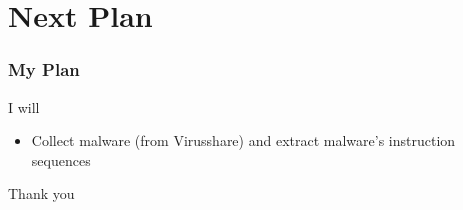 \documentclass{beamer}
\begin{document}
\section{Next Plan}
\begin{frame}[label=plan]
\frametitle{My Plan}
I will 
\begin{itemize}
	\item Collect malware (from Virusshare) and extract malware's instruction sequences 

\end{itemize} 

\hyperlink{currentwork}{}

\end{frame}




\begin{frame}
\Huge{\centerline{Thank you}}
\end{frame}

\end{document}

